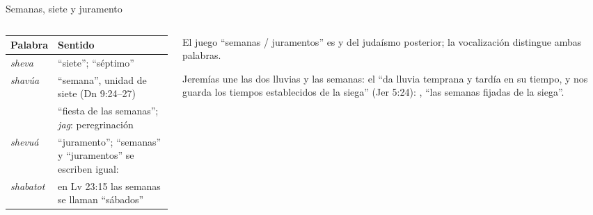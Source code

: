 \begin{frame}{Semanas, siete y juramento}
\begin{columns}[t,onlytextwidth]
\begin{column}{0.55\textwidth}
\scriptsize\renewcommand{\arraystretch}{1.12}
\begin{tabular}{@{}L{2.2cm}L{4.4cm}@{}}
\toprule
\textbf{Palabra} & \textbf{Sentido} \\ \midrule
{} \emph{sheva} & ``siete'';  ``séptimo'' \\
 \emph{shavúa} & ``semana'', unidad de siete (Dn 9:24--27) \\
 & ``fiesta de las semanas''; \emph{jag}: peregrinación \\
 \emph{shevuá} & ``juramento''; ``semanas'' y ``juramentos'' se escriben igual:  \\
 \emph{shabatot} & en Lv 23:15 las semanas se llaman ``sábados'' \\
\bottomrule
\end{tabular}
\end{column}
\begin{column}{0.43\textwidth}\small\RaggedRight
El juego ``semanas / juramentos'' es  y del judaísmo posterior; la vocalización distingue ambas palabras.\par\medskip
Jeremías une las dos lluvias y las semanas: el \SENOR{} ``da lluvia temprana y tardía en su tiempo, y nos guarda los tiempos establecidos de la siega'' (Jer 5:24): , ``las semanas fijadas de la siega''.
\end{column}
\end{columns}
\end{frame}

